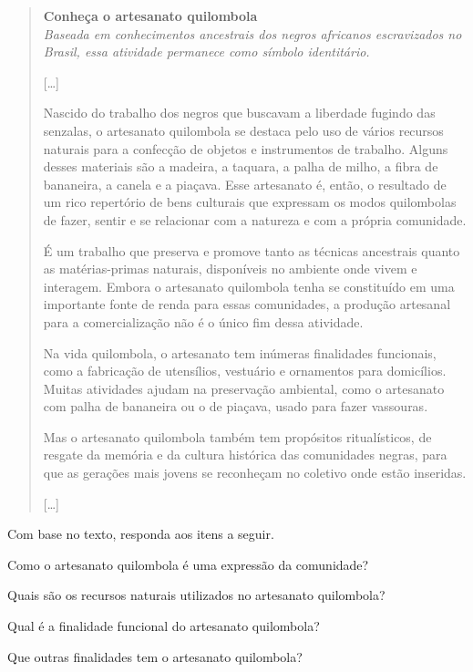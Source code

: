 \begin{quote}
\textbf{Conheça o artesanato quilombola}\\
\textit{Baseada em conhecimentos ancestrais dos negros africanos escravizados no Brasil, essa atividade permanece como símbolo identitário.}

{[}\ldots{}{]}

Nascido do trabalho dos negros que buscavam a liberdade fugindo das
senzalas, o artesanato quilombola se destaca pelo uso de vários recursos
naturais para a confecção de objetos e instrumentos de trabalho. Alguns
desses materiais são a madeira, a taquara, a palha de milho, a fibra de
bananeira, a canela e a piaçava. Esse artesanato é, então, o resultado
de um rico repertório de bens culturais que expressam os modos
quilombolas de fazer, sentir e se relacionar com a natureza e com a
própria comunidade.

É um trabalho que preserva e promove tanto as técnicas ancestrais quanto
as matérias-primas naturais, disponíveis no ambiente onde vivem e
interagem. Embora o artesanato quilombola tenha se constituído em uma
importante fonte de renda para essas comunidades, a produção artesanal
para a comercialização não é o único fim dessa atividade.

Na vida quilombola, o artesanato tem inúmeras finalidades funcionais,
como a fabricação de utensílios, vestuário e ornamentos para domicílios.
Muitas atividades ajudam na preservação ambiental, como o artesanato com
palha de bananeira ou o de piaçava, usado para fazer vassouras.

Mas o artesanato quilombola também tem propósitos ritualísticos, de
resgate da memória e da cultura histórica das comunidades negras, para
que as gerações mais jovens se reconheçam no coletivo onde estão
inseridas.

{[}\ldots{}{]}

\end{quote}

Com base no texto, responda aos itens a seguir.

\begin{escolha}
\item Como o artesanato quilombola é uma expressão da comunidade?

\item Quais são os recursos naturais utilizados no artesanato quilombola?

\item Qual é a finalidade funcional do artesanato quilombola?

\item Que outras finalidades tem o artesanato quilombola?
\end{escolha}

